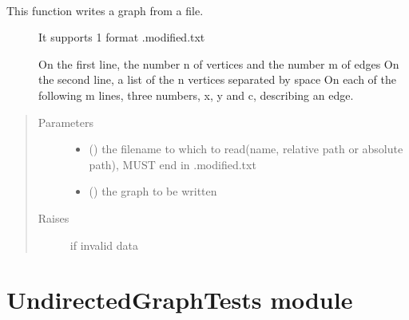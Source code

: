 \documentclass[letterpaper,10pt,english]{sphinxmanual}
\begin{document}
\begin{fulllineitems}
\label{\detokenize{UndirectedGraph:UndirectedGraph.write_graph}}~\begin{description}
\item[{This function writes a graph from a file.}] \leavevmode
It supports 1 format
.modified.txt

On the first line, the number n of vertices and the number m of edges
On the second line, a list of the n vertices separated by space
On each of the following m lines, three numbers, x, y and c, describing an edge.

\end{description}
\begin{quote}\begin{description}
\item[{Parameters}] \leavevmode\begin{itemize}
\item {} 
 () \textendash{} the filename to which to read(name, relative path or absolute path), MUST end in .modified.txt

\item {} 
 ({\hyperref[\detokenize{UndirectedGraph:UndirectedGraph.UndirectedGraph}]{}}) \textendash{} the graph to be written

\end{itemize}

\item[{Raises}] \leavevmode
{} \textendash{} if invalid data

\end{description}\end{quote}

\end{fulllineitems}



\section{UndirectedGraphTests module}
\label{\detokenize{UndirectedGraphTests:module-UndirectedGraphTests}}\label{\detokenize{UndirectedGraphTests:undirectedgraphtests-module}}\label{\detokenize{UndirectedGraphTests::doc}}
\end{document}
